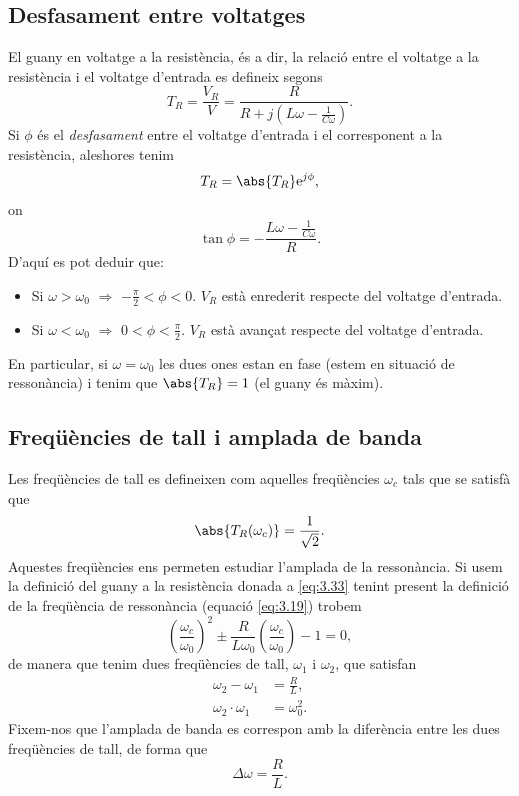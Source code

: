 \documentclass[a4paper,10.5pt]{report}
\begin{document}
\subsection{Desfasament entre voltatges}
El guany en voltatge a la resistència, és a dir, la relació entre el voltatge a la resistència i el voltatge d'entrada es defineix segons
\begin{equation}
	T_R = \frac{V_R}{V} = \frac{R}{R+j(L\omega - \frac{1}{C\omega})} \label{eq:3.33}.
\end{equation}
Si $\phi$ és el \textit{desfasament} entre el voltatge d'entrada i el corresponent a la resistència, aleshores tenim
\begin{equation}
	T_R = \abs{T_R}\mathrm{e}^{j \phi},
\end{equation}
on
\begin{equation}
	\tan \phi = -\frac{L\omega - \frac{1}{C\omega}}{R}.
\end{equation}
D'aquí es pot deduir que:
\begin{itemize}
	\item Si $\omega > \omega_0$ $\Rightarrow$ $-\frac{\pi}{2}<\phi<0$. $V_R$ està enrederit respecte del voltatge d'entrada.
 	\item Si $\omega < \omega_0$ $\Rightarrow$ $0<\phi<\frac{\pi}{2}$. $V_R$ està avançat respecte del voltatge d'entrada.
\end{itemize}
En particular, si $\omega = \omega_0$ les dues ones estan en fase (estem en situació de ressonància) i tenim que $\abs{T_R} = 1$ (el guany és màxim).

\subsection{Freqüències de tall i amplada de banda}
Les freqüències de tall es defineixen com aquelles freqüències $\omega_c$ tals que se satisfà que
\begin{equation}
	\abs{T_R(\omega_c)} = \frac{1}{\sqrt{2}}.
\end{equation}
Aquestes freqüències ens permeten estudiar l'amplada de la ressonància. Si usem la definició del guany a la resistència donada a \eqref{eq:3.33} tenint present la definició de la freqüència de ressonància (equació \eqref{eq:3.19}) trobem
\begin{equation}
	\left(\frac{\omega_c}{\omega_0}\right)^2 \pm \frac{R}{L\omega_0}\left(\frac{\omega_c}{\omega_0}\right) -1=0,
\end{equation}
de manera que tenim dues freqüències de tall, $\omega_1$ i $\omega_2$, que satisfan 
\begin{align}
	\omega_2-\omega_1 & = \frac{R}{L}, \label{eq:3.38} \\
	\omega_2 \cdot \omega_1 & = \omega_0^2 \label{eq:3.39}.
\end{align}
Fixem-nos que l'amplada de banda es correspon amb la diferència entre les dues freqüències de tall, de forma que
\begin{equation}
	\Delta \omega = \frac{R}{L}.
\end{equation}
\end{document}
